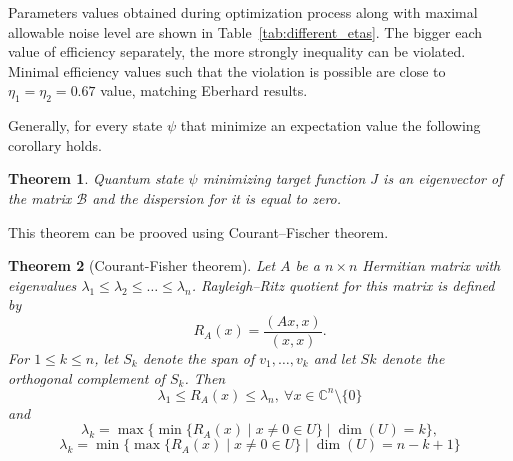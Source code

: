 \documentclass[%
master,         %
subf,           %
href,           %
colorlinks=true %
]{disser}
\numberwithin{equation}{section}
\numberwithin{figure}{section}
\newtheorem{theorem}{Theorem}[section]
\begin{document}
\endgroup

Parameters values obtained during optimization process along with maximal allowable noise level 
are shown in Table~\ref{tab:different_etas}. The bigger each value of efficiency separately, the more 
strongly inequality can be violated. Minimal efficiency values such that the violation is possible are close 
to  $\eta_1 = \eta_2 = 0.67$ value, matching Eberhard results.

Generally, for every state $\psi$ that minimize an expectation value the following corollary holds.

\begin{theorem}
Quantum state $\psi$ minimizing target function $J$ is an eigenvector of the matrix $\mathcal{B}$ and the dispersion for it is equal to zero.
\label{thm:psi_thm}
\end{theorem}

This theorem can be prooved using Courant–Fischer theorem.
\begin{theorem}[Courant-Fisher theorem]
Let $A$ be a $n \times n$ Hermitian matrix with eigenvalues $\lambda_1 \leq \lambda_2 \leq \ldots \leq \lambda_n$. Rayleigh–Ritz quotient for this matrix is defined by 
\[
R_A(x) = \frac{(Ax, x)}{(x,x)}.
\]
For $1 \leq k \leq n$, let $S_k$ denote the span of $v_1,\ldots ,v_k$ and let $Sk$ denote the orthogonal complement of $S_k$.
Then
\[
\lambda_1 \leq R_A(x) \leq \lambda_n, \ \forall x \in \mathbb{C}^n\setminus \{0\}
\]
and
\[
\lambda_k = \max\{\min \{R_A(x)\mid x\neq 0 \in U\} \mid \dim(U) = k \},
\]
\[
\lambda_k = \min \{ \max\{R_A(x)\mid x\neq 0 \in U\} \mid  \dim(U) = n - k +1\}
\]
\end{theorem}
\end{document}
